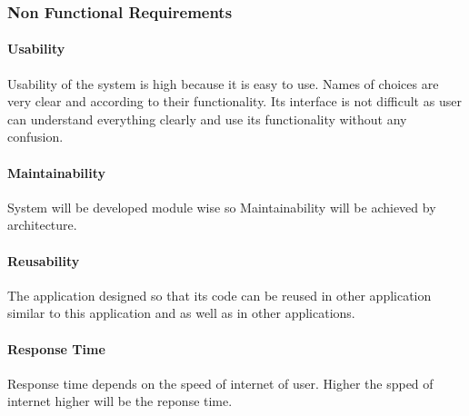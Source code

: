 \subsubsection{Non Functional Requirements}
\paragraph{Usability}
Usability of the system is high because it is easy to use. Names of choices are very clear and according to their functionality. Its interface is not difficult as user can understand
everything clearly and use its functionality without any confusion.  
\paragraph{Maintainability}
System will be developed module wise so Maintainability will be achieved by architecture.
\paragraph{Reusability}
The application designed so that its code can be reused in other application similar to this application and as well as in other applications.
\paragraph{Response Time}
Response time depends on the speed of internet of user. Higher the spped of internet higher will be the reponse time.

